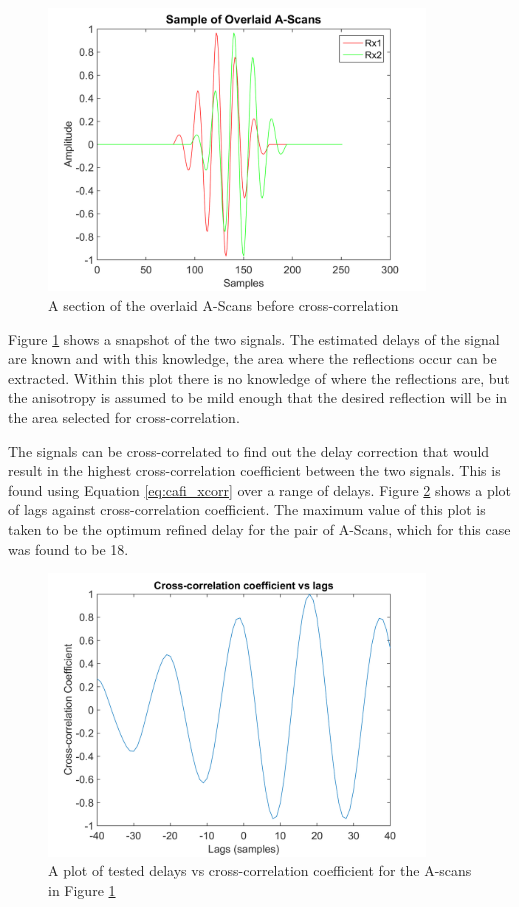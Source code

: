\begin{figure}[htb]
\centering
		\includegraphics[width=100mm]{Anisotropic_5.png}
		\caption{A section of the overlaid A-Scans before cross-correlation}
		\label{fig:cafi_anisotropic5}
\end{figure}

Figure \ref{fig:cafi_anisotropic5} shows a snapshot of the two signals. The estimated delays of the signal are known and with this knowledge, the area where the reflections occur can be extracted. Within this plot there is no knowledge of where the reflections are, but the anisotropy is assumed to be mild enough that the desired reflection will be in the area selected for cross-correlation.

The signals can be cross-correlated to find out the delay correction that would result in the highest cross-correlation coefficient between the two signals. This is found using Equation \ref{eq:cafi_xcorr} over a range of delays. Figure \ref{fig:cafi_anisotropic10} shows a plot of lags against cross-correlation coefficient. The maximum value of this plot is taken to be the optimum refined delay for the pair of A-Scans, which for this case was found to be 18.

\begin{figure}[htb]
\centering
		\includegraphics[width=100mm]{Anisotropic_10.png}
		\caption{A plot of tested delays vs cross-correlation coefficient for the A-scans in Figure \ref{fig:cafi_anisotropic5}}
		\label{fig:cafi_anisotropic10}
\end{figure}

